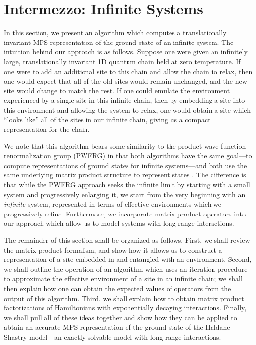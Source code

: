 \documentclass[12pt]{amsbook}
\theoremstyle{plain}
\theoremstyle{definition}
\theoremstyle{remark}
\begin{document}
\section{Intermezzo: Infinite Systems}

In this section, we present an algorithm which computes a translationally invariant MPS representation of the ground state of an infinite system.  The intuition behind our approach is as follows.  Suppose one were given an infinitely large, translationally invariant 1D quantum chain held at zero temperature.  If one were to add an additional site to this chain and allow the chain to relax, then one would expect that all of the old sites would remain unchanged, and the new site would change to match the rest.  If one could emulate the environment experienced by a single site in this infinite chain, then by embedding a site into this environment and allowing the system to relax, one would obtain a site which ``looks like'' all of the sites in our infinite chain, giving us a compact representation for the chain.

We note that this algorithm bears some similarity to the product wave
function renormalization group (PWFRG) \cite{Nishino:1995kx} in that
both algorithms have the same goal---to compute representations of
ground states for infinite systems---and both use the same underlying
matrix product structure to represent states \cite{pwfrg-mps-2}.  The
difference is that while the PWFRG approach seeks the infinite limit
by starting with a small system and progressively enlarging it, we
start from the very beginning with an \emph{infinite} system,
represented in terms of effective environments which we progressively
refine.  Furthermore, we incorporate matrix product operators into our
approach which allow us to model systems with long-range interactions.

The remainder of this section shall be organized as follows.  First, we shall review the matrix product formalism, and show how it allows us to construct a representation of a site embedded in and entangled with an environment.  Second, we shall outline the operation of an algorithm which uses an iteration procedure to approximate the effective environment of a site in an infinite chain;  we shall then explain how one can obtain the expected values of operators from the output of this algorithm.  Third, we shall explain how to obtain matrix product factorizations of Hamiltonians with exponentially decaying interactions.  Finally, we shall pull all of these ideas together and show how they can be applied to abtain an accurate MPS representation of the ground state of the Haldane-Shastry model---an exactly solvable model with long range interactions.
\end{document}
